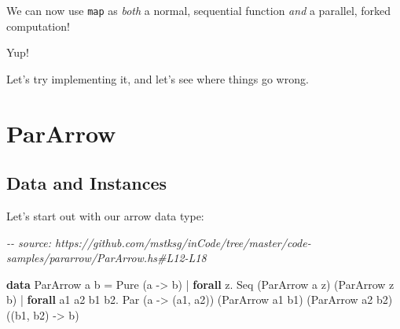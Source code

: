 \documentclass[]{article}
\newenvironment{Shaded}{}{}
\newcommand{\CommentTok}[1]{\textcolor[rgb]{0.38,0.63,0.69}{\textit{#1}}}
\newcommand{\DataTypeTok}[1]{\textcolor[rgb]{0.56,0.13,0.00}{#1}}
\newcommand{\DecValTok}[1]{\textcolor[rgb]{0.25,0.63,0.44}{#1}}
\newcommand{\KeywordTok}[1]{\textcolor[rgb]{0.00,0.44,0.13}{\textbf{#1}}}
\newcommand{\NormalTok}[1]{#1}
\newcommand{\OperatorTok}[1]{\textcolor[rgb]{0.40,0.40,0.40}{#1}}
\newcommand{\OtherTok}[1]{\textcolor[rgb]{0.00,0.44,0.13}{#1}}
\begin{document}
We can now use \texttt{map\textquotesingle{}} as \emph{both} a normal,
sequential function \emph{and} a parallel, forked computation!

\begin{Shaded}
\end{Shaded}

Yup!

Let's try implementing it, and let's see where things go wrong.

\section{ParArrow}\label{pararrow}

\subsection{Data and Instances}\label{data-and-instances}

Let's start out with our arrow data type:

\begin{Shaded}
\begin{Highlighting}[]
\CommentTok{{-}{-} source: https://github.com/mstksg/inCode/tree/master/code{-}samples/pararrow/ParArrow.hs\#L12{-}L18}

\KeywordTok{data} \DataTypeTok{ParArrow}\NormalTok{ a b }\OtherTok{=}                     \DataTypeTok{Pure}\NormalTok{  (a }\OtherTok{{-}\textgreater{}}\NormalTok{ b)}
                  \OperatorTok{|} \KeywordTok{forall}\NormalTok{ z}\OperatorTok{.}           \DataTypeTok{Seq}\NormalTok{   (}\DataTypeTok{ParArrow}\NormalTok{ a z)}
\NormalTok{                                              (}\DataTypeTok{ParArrow}\NormalTok{ z b)}
                  \OperatorTok{|} \KeywordTok{forall}\NormalTok{ a1 a2 b1 b2}\OperatorTok{.} \DataTypeTok{Par}\NormalTok{   (a }\OtherTok{{-}\textgreater{}}\NormalTok{ (a1, a2))}
\NormalTok{                                              (}\DataTypeTok{ParArrow}\NormalTok{ a1 b1)}
\NormalTok{                                              (}\DataTypeTok{ParArrow}\NormalTok{ a2 b2)}
\NormalTok{                                              ((b1, b2) }\OtherTok{{-}\textgreater{}}\NormalTok{ b)}
\end{Highlighting}
\end{Shaded}
\end{document}
